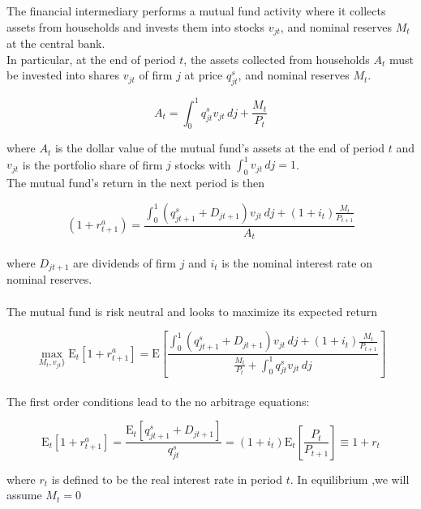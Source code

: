 \documentclass[titlepage]{\econtex}\providecommand{\texname}{Dissertation-Proposal}
\begin{document}
\label{subsec:Financial Intermediary}

The financial intermediary performs a mutual fund activity where it collects assets from households and invests them into stocks $v_{jt}$, and nominal reserves $M_{t}$ at the central bank.\\ 

In particular, at the end of period $t$, the assets collected from households $A_{t}$ must be invested into shares $\mathit{v}_{jt}$ of firm $j$ at price  $q^{s}_{jt}$,  and nominal reserves $M_{t}$. 

\begin{equation} A_{t} =  \int_{0}^{1} q^{s}_{jt}\mathit{v}_{jt}\,dj  + \frac{M_{t}}{P_{t}}\end{equation}

where $A_{t} $ is the dollar value of the mutual fund's assets at the end of period $t$ and $ \mathit{v}_{jt}$ is the portfolio share of firm $j$ stocks with $\int_{0}^{1} \mathit{v}_{jt}\,dj =1$.  \\

The mutual fund's return in the next period is then 

$$(1+r^{a}_{t+1})  = \frac{  \int_{0}^{1} (q^{s}_{jt+1}+ D_{jt+1})\mathit{v}_{jt} \, dj +(1+i_{t}) \frac{M_{t}}{P_{t+1}}}{A_{t}}$$\\ 

where  $D_{jt+1}$ are dividends of firm $j$ and $i_{t}$ is the nominal interest rate  on nominal reserves. \\ \\

The mutual fund is risk neutral and looks to maximize its expected return 

$$\max_{ M_{t} , \mathit{v}_{jt} \}} \mathrm{E}_{t}\left[1+r^{a}_{t+1} \right] = \mathrm{E}\left[ \frac{ \int_{0}^{1} (q^{s}_{jt+1}+ D_{jt+1})\mathit{v}_{jt} \, dj +(1+i_{t}) \frac{M_{t}}{P_{t+1}}}{\frac{M_{t}}{P_{t}}  + \int_{0}^{1} q^{s}_{jt}\mathit{v}_{jt}\,dj} \right]$$ \\

 
The first order conditions lead to the no arbitrage equations:

\begin{equation} \mathrm{E}_{t}\left[1+r^{a}_{t+1}\right] =\frac{\mathrm{E}_{t}\left[q^{s}_{jt+1} + D_{jt+1} \right]}{q^{s}_{jt}} = (1+i_{t}) \mathrm{E}_{t}\left[\frac{P_{t}}{P_{t+1}}\right] \equiv 1 +r_{t} \end{equation}

where $r_{t}$ is defined to be the real interest rate in period $t$. 
In equilibrium ,we will assume $M_{t} =0$ \\ \\
\end{document}

